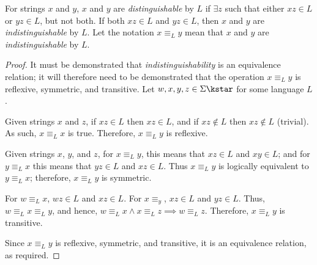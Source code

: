 For strings $x$ and $y$, $x$ and $y$ are \emph{distinguishable} by $L$ if $\exists z$ such that either $xz \in L$ or $yz \in L$, but not both. If both $xz \in L$ and $yz \in L$, then $x$ and $y$ are \emph{indistinguishable} by $L$. Let the notation $x \equiv_L y$ mean that $x$ and $y$ are \emph{indistinguishable} by $L$.


\begin{proof}
	It must be demonstrated that \emph{indistinguishability} is an equivalence relation; it will therefore need to be demonstrated that the operation $x \equiv_L y$ is reflexive, symmetric, and transitive. Let $w,x,y,z \in \Sigma\kstar$ for some language $L$.
	\begin{description}[]
		\item[Reflexivity:] Given strings $x$ and $z$, if $xz \in L$ then $xz \in L$, and if $xz \notin L$ then $xz \notin L$ (trivial). As such, $x \equiv_L x$ is true. Therefore, $x \equiv_L y$ is reflexive.
		\item[Symmetry:] Given strings $x$, $y$, and $z$, for $x \equiv_L y$, this means that $xz \in L$ and $xy \in L$; and for $y \equiv_L x$ this means that $yz \in L$ and $xz \in L$. Thus $x \equiv_L y$ is logically equivalent to $y \equiv_L x$; therefore, $x \equiv_L y$ is symmetric.
		\item[Transitivity:] For $w \equiv_L x$, $wz \in L$ and $xz \in L$. For $x \equiv_y$, $xz \in L$ and $yz \in L$. Thus, $w \equiv_L x \equiv_L y$, and hence, $w \equiv_L x \land x \equiv_L z \implies w \equiv_L z$. Therefore, $x \equiv_L y$ is transitive.
	\end{description}
	Since $x \equiv_L y$ is reflexive, symmetric, and transitive, it is an equivalence relation, as required.
\end{proof}